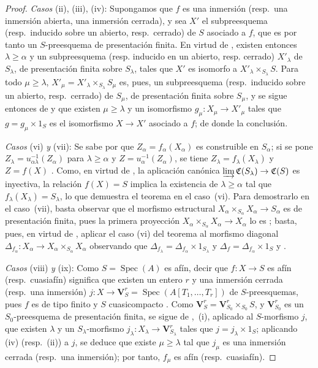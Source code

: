\begin{proof}
\emph{Casos} (ii), (iii), (iv): Supongamos que $f$ es una inmersión (resp.\ una inmersión abierta, una inmersión cerrada), y sea $X'$ el subpreesquema (resp.\ inducido sobre un abierto, resp.\ cerrado) de $S$ asociado a $f$, que es por tanto un $S$-preesquema de presentación finita.
En virtud de , existen entonces $\lambda\geq\alpha$ y un subpreesquema (resp. inducido en un abierto, resp. cerrado) $X'_\lambda$ de $S_\lambda$, de presentación finita sobre $S_\lambda$, tales que $X'$ es isomorfo a $X'_\lambda\times_{S_\lambda}S$.
Para todo $\mu\geq\lambda$, $X'_\mu=X'_\lambda\times_{S_\lambda}S_\mu$ es, pues, un subpreesquema (resp.\ inducido sobre un abierto, resp.\ cerrado) de $S_\mu$, de presentación finita sobre $S_\mu$, y se sigue entonces de  y  que existen $\mu\geq\lambda$ y un isomorfismo $g_\mu:X_\mu\to X'_\mu$ tales que $g=g_\mu\times1_S$ es el isomorfismo $X\to X'$ asociado a $f$; de donde la conclusión.

\emph{Casos} (vi) \emph{y} (vii): Se sabe por  que $Z_\alpha=f_\alpha(X_\alpha)$ es construible en $S_\alpha$; si se pone $Z_\lambda=u_{\alpha\lambda}^{-1}(Z_\alpha)$ para $\lambda\geq\alpha$ y $Z=u_\alpha^{-1}(Z_\alpha)$, se tiene $Z_\lambda=f_\lambda(X_\lambda)$ y $Z=f(X)$ .
Como, en virtud de , la aplicación canónica $\varinjlim\mathfrak C(S_\lambda)\to\mathfrak C(S)$ es inyectiva, la relación $f(X)=S$ implica la existencia de $\lambda\geq\alpha$ tal que $f_\lambda(X_\lambda)=S_\lambda$, lo que demuestra el teorema en el caso~(vi).
Para demostrarlo en el caso~(vii), basta observar que el morfismo estructural $X_\alpha\times_{S_\alpha}X_\alpha\to S_\alpha$ es de presentación finita, pues la primera proyección $X_\alpha\times_{S_\alpha}X_\alpha\to X_\alpha$ lo es ; basta, pues, en virtud de , aplicar el caso (vi) del teorema al morfismo diagonal
$\Delta_{f_\alpha}:X_\alpha\to X_\alpha\times_{S_\alpha}X_\alpha$
observando que $\Delta_{f_\lambda}=\Delta_{f_\alpha}\times1_{S_\lambda}$ y $\Delta_f=\Delta_{f_\alpha}\times1_S$  y .

\emph{Casos} (viii) \emph{y} (ix): Como $S=\operatorname{Spec}(A)$ es afín, decir que $f:X\to S$ es afín (resp.\ cuasiafín) significa que existen un entero $r$ y una inmersión cerrada (resp.\ una inmersión) $j:X\to\mathbf V_S^r=\operatorname{Spec}(A[T_1,\ldots,T_r])$ de $S$-preesquemas, pues $f$ es de tipo finito y $S$ cuasicompacto .
Como $\mathbf V_S^r=\mathbf V_{S_0}^r\times_{S_0}S$, y $\mathbf V_{S_0}^r$ es un $S_0$-preesquema de presentación finita, se sigue de ,~(i), aplicado al $S$-morfismo $j$, que existen $\lambda$ y un $S_\lambda$-morfismo $j_\lambda:X_\lambda\to\mathbf V_{S_\lambda}^r$ tales que $j=j_\lambda\times1_S$; aplicando (iv) (resp.\ (ii)) a $j$, se deduce que existe $\mu\geq\lambda$ tal que $j_\mu$ es una inmersión cerrada (resp.\ una inmersión); por tanto, $f_\mu$ es afín (resp.\ cuasiafín).


\end{proof}
